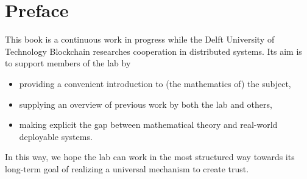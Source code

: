 \chapter{Preface}
This book is a continuous work in progress while the Delft University of Technology Blockchain researches cooperation in distributed systems. 
Its aim is to support members of the lab by
\begin{itemize}
	\item 
	providing a convenient introduction to (the mathematics of) the subject,
	\item
	supplying an overview of previous work by both the lab and others,
	\item
	making explicit the gap between mathematical theory and real-world deployable systems.
\end{itemize}
In this way, we hope the lab can work in the most structured way towards its long-term goal of realizing a universal mechanism to create trust. 